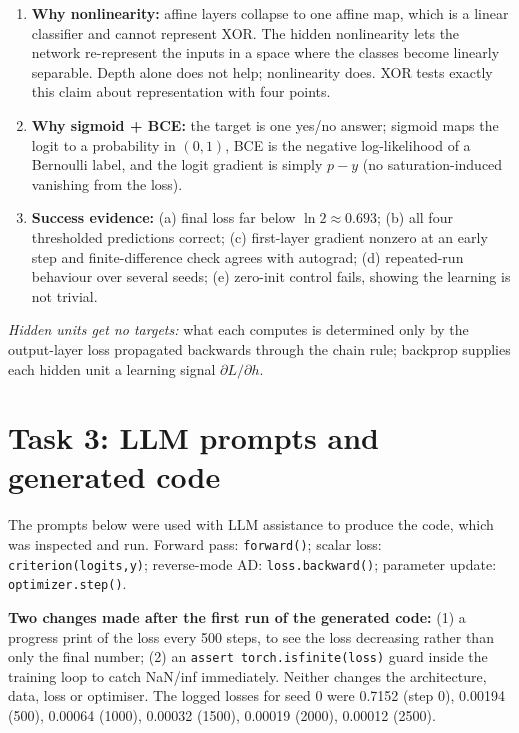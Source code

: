\documentclass[10pt,a4paper]{article}
\begin{document}
\begin{enumerate}[leftmargin=*]
\item \textbf{Why nonlinearity:} affine layers collapse to one affine map, which is a linear classifier and cannot represent XOR. The hidden nonlinearity lets the network re-represent the inputs in a space where the classes become linearly separable. Depth alone does not help; nonlinearity does. XOR tests exactly this claim about representation with four points.
\item \textbf{Why sigmoid + BCE:} the target is one yes/no answer; sigmoid maps the logit to a probability in $(0,1)$, BCE is the negative log-likelihood of a Bernoulli label, and the logit gradient is simply $p-y$ (no saturation-induced vanishing from the loss).
\item \textbf{Success evidence:} (a) final loss far below $\ln2\approx0.693$; (b) all four thresholded predictions correct; (c) first-layer gradient nonzero at an early step and finite-difference check agrees with autograd; (d) repeated-run behaviour over several seeds; (e) zero-init control fails, showing the learning is not trivial.
\end{enumerate}
\textit{Hidden units get no targets:} what each computes is determined only by the output-layer loss propagated backwards through the chain rule; backprop supplies each hidden unit a learning signal $\partial L/\partial h$.

\section*{Task 3: LLM prompts and generated code}
The prompts below were used with LLM assistance to produce the code, which was inspected and run. Forward pass: \texttt{forward()}; scalar loss: \texttt{criterion(logits,y)}; reverse-mode AD: \texttt{loss.backward()}; parameter update: \texttt{optimizer.step()}.

\textbf{Two changes made after the first run of the generated code:} (1) a progress print of the loss every 500 steps, to see the loss decreasing rather than only the final number; (2) an \texttt{assert torch.isfinite(loss)} guard inside the training loop to catch NaN/inf immediately. Neither changes the architecture, data, loss or optimiser. The logged losses for seed 0 were 0.7152 (step 0), 0.00194 (500), 0.00064 (1000), 0.00032 (1500), 0.00019 (2000), 0.00012 (2500).
\end{document}
